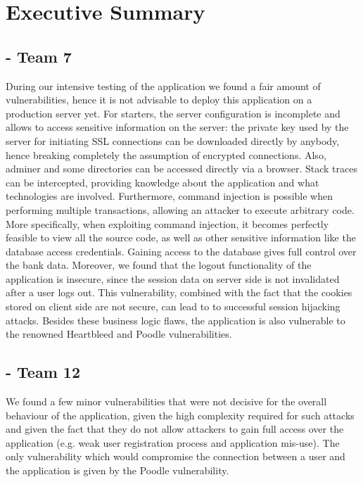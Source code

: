 \chapter{Executive Summary}

\section{\bs - Team 7}
During our intensive testing of the \bs{} application we found a fair amount of vulnerabilities, hence it is not advisable to deploy this application on a production server yet.\newline
For starters, the server configuration is incomplete and allows to access sensitive information on the server: the private key used by the server for initiating SSL connections can be downloaded directly by anybody, hence breaking completely the assumption of encrypted connections.
Also, adminer and some directories can be accessed directly via a browser.\newline
Stack traces can be intercepted, providing knowledge about the application and what technologies are involved. Furthermore, command injection is possible when performing multiple transactions, allowing an attacker to execute arbitrary code. More specifically, when exploiting command injection, it becomes perfectly feasible to view all the source code, as well as other sensitive information like the database access credentials. Gaining access to the database gives full control over the bank data.\newline
Moreover, we found that the logout functionality of the application is insecure, since the session data on server side is not invalidated after a user logs out. This vulnerability, combined with the fact that the cookies stored on client side are not secure, can lead to to successful session hijacking attacks.\newline
Besides these business logic flaws, the application is also vulnerable to the renowned Heartbleed and Poodle vulnerabilities.


\section{\gnb - Team 12}
We found a few minor vulnerabilities that were not decisive for the overall behaviour of the application, given the high complexity required for such attacks and given the fact that they do not allow attackers to gain full access over the application (e.g. weak user registration process and application mis-use). The only vulnerability which would compromise the connection between a user and the application is given by the Poodle vulnerability.